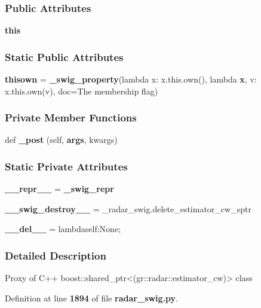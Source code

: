 \subsubsection*{Public Attributes}
\begin{DoxyCompactItemize}
\item 
{\bf this}
\end{DoxyCompactItemize}
\subsubsection*{Static Public Attributes}
\begin{DoxyCompactItemize}
\item 
{\bf thisown} = {\bf \+\_\+swig\+\_\+property}(lambda x\+: x.\+this.\+own(), lambda {\bf x}, v\+: x.\+this.\+own(v), doc=\textquotesingle{}The membership flag\textquotesingle{})
\end{DoxyCompactItemize}
\subsubsection*{Private Member Functions}
\begin{DoxyCompactItemize}
\item 
def {\bf \+\_\+post} (self, {\bf args}, kwargs)
\end{DoxyCompactItemize}
\subsubsection*{Static Private Attributes}
\begin{DoxyCompactItemize}
\item 
{\bf \+\_\+\+\_\+repr\+\_\+\+\_\+} = {\bf \+\_\+swig\+\_\+repr}
\item 
{\bf \+\_\+\+\_\+swig\+\_\+destroy\+\_\+\+\_\+} = \+\_\+radar\+\_\+swig.\+delete\+\_\+estimator\+\_\+cw\+\_\+sptr
\item 
{\bf \+\_\+\+\_\+del\+\_\+\+\_\+} = lambdaself\+:\+None;
\end{DoxyCompactItemize}


\subsubsection{Detailed Description}
\begin{DoxyVerb}Proxy of C++ boost::shared_ptr<(gr::radar::estimator_cw)> class\end{DoxyVerb}
 

Definition at line {\bf 1894} of file {\bf radar\+\_\+swig.\+py}.



